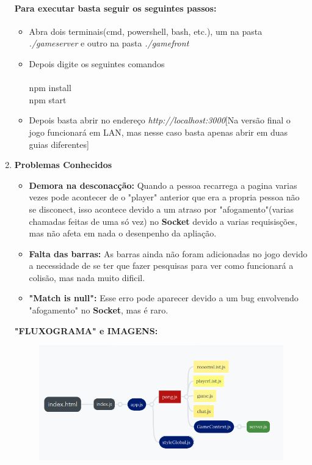 \documentclass[12pt,openright,oneside,a4paper,brazil,article]{abntex2}
\begin{document}
\begin{enumerate}
    \paragraph*{Para executar basta seguir os seguintes passos:}
    \begin{itemize}
      \item Abra dois terminais(cmd, powershell, bash, etc.), um na pasta \textit{./gameserver} e outro na pasta \textit{./gamefront}
      
      \item Depois digite os seguintes comandos\\\\
      npm install
      \\
      npm start

      \item Depois basta abrir no endereço \textit{http://localhost:3000}[Na versão final o jogo funcionará em LAN, mas nesse caso basta apenas abrir em duas guias diferentes]
    \end{itemize}
    \item \textbf{Problemas Conhecidos}
    \begin{itemize}
      \item \textbf{Demora na desconacção:} Quando a pessoa recarrega a pagina varias vezes pode acontecer de o "player" anterior que 
      era a propria pessoa não se disconect, isso acontece devido a um atraso por "afogamento"(varias chamadas feitas de uma só vez) no \textbf{Socket} devido a varias requisisções, 
      mas não afeta em nada o desenpenho da apliação.
      \item \textbf{Falta das barras:} As barras ainda não foram adicionadas no jogo devido a necessidade de se ter que fazer pesquisas para ver
      como funcionará a colisão, mas nada muito dificil.
      \item \textbf{"Match is null":} Esse erro pode aparecer devido a um bug envolvendo "afogamento" no \textbf{Socket}, mas é raro.
    \end{itemize} 
    
    \textbf{"FLUXOGRAMA" e IMAGENS:}
    \begin{center}
      \begin{figure}
        \includegraphics[scale=1]{fluxograma.png}
      \end{figure}  
    \end{center}


\end{enumerate}
\end{document}
